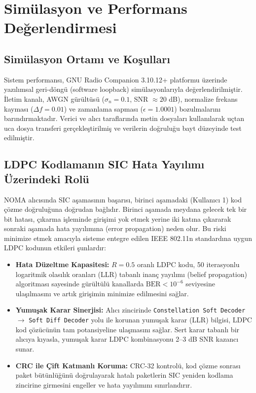 \section{Simülasyon ve Performans Değerlendirmesi}

\subsection{Simülasyon Ortamı ve Koşulları}
Sistem performansı, GNU Radio Companion 3.10.12+ platformu üzerinde yazılımsal geri-döngü (software loopback) simülasyonlarıyla değerlendirilmiştir. İletim kanalı, AWGN gürültüsü ($\sigma_n = 0.1$, SNR $\approx 20$ dB), normalize frekans kayması ($\Delta f = 0.01$) ve zamanlama sapması ($\epsilon = 1.0001$) bozulmalarını barındırmaktadır. Verici ve alıcı taraflarında metin dosyaları kullanılarak uçtan uca dosya transferi gerçekleştirilmiş ve verilerin doğruluğu bayt düzeyinde test edilmiştir.

\subsection{LDPC Kodlamanın SIC Hata Yayılımı Üzerindeki Rolü}
NOMA alıcısında SIC aşamasının başarısı, birinci aşamadaki (Kullanıcı 1) kod çözme doğruluğuna doğrudan bağlıdır. Birinci aşamada meydana gelecek tek bir bit hatası, çıkarma işleminde girişimi yok etmek yerine iki katına çıkararak sonraki aşamada hata yayılımına (error propagation) neden olur. Bu riski minimize etmek amacıyla sisteme entegre edilen IEEE 802.11n standardına uygun LDPC kodunun etkileri şunlardır:
\begin{itemize}
    \item \textbf{Hata Düzeltme Kapasitesi:} $R=0.5$ oranlı LDPC kodu, 50 iterasyonlu logaritmik olasılık oranları (LLR) tabanlı inanç yayılımı (belief propagation) algoritması sayesinde gürültülü kanallarda $\text{BER} < 10^{-6}$ seviyesine ulaşılmasını ve artık girişimin minimize edilmesini sağlar.
    \item \textbf{Yumuşak Karar Sinerjisi:} Alıcı zincirinde \texttt{Constellation Soft Decoder} $\to$ \texttt{Soft Diff Decoder} yolu ile korunan yumuşak karar (LLR) bilgisi, LDPC kod çözücünün tam potansiyeline ulaşmasını sağlar. Sert karar tabanlı bir alıcıya kıyasla, yumuşak karar LDPC kombinasyonu 2--3 dB SNR kazancı sunar.
    \item \textbf{CRC ile Çift Katmanlı Koruma:} CRC-32 kontrolü, kod çözme sonrası paket bütünlüğünü doğrulayarak hatalı paketlerin SIC yeniden kodlama zincirine girmesini engeller ve hata yayılımını sınırlandırır.
\end{itemize}

